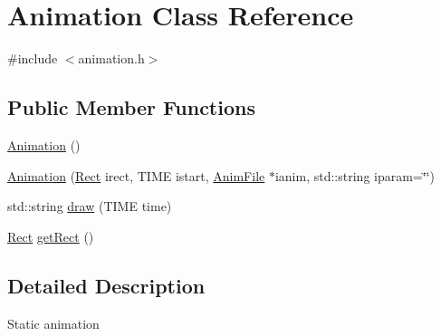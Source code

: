 \hypertarget{class_animation}{\section{Animation Class Reference}
\label{class_animation}
}


{\ttfamily \#include $<$animation.\-h$>$}

\subsection*{Public Member Functions}
\begin{DoxyCompactItemize}
\item 
\hyperlink{class_animation_a83f0a16cef7117f187ad596de38dd9d6}{Animation} ()
\item 
\hyperlink{class_animation_a97aee78e26558779ceaf1e9fe246720c}{Animation} (\hyperlink{struct_rect}{Rect} irect, T\-I\-M\-E istart, \hyperlink{class_anim_file}{Anim\-File} $\ast$ianim, std\-::string iparam=\char`\"{}\char`\"{})
\item 
std\-::string \hyperlink{class_animation_a1472a0972103d62a94f493f75ad91fa6}{draw} (T\-I\-M\-E time)
\item 
\hyperlink{struct_rect}{Rect} \hyperlink{class_animation_a62aeb060f1cc2b6cc012ca4461a4ff24}{get\-Rect} ()
\end{DoxyCompactItemize}


\subsection{Detailed Description}
Static animation 

